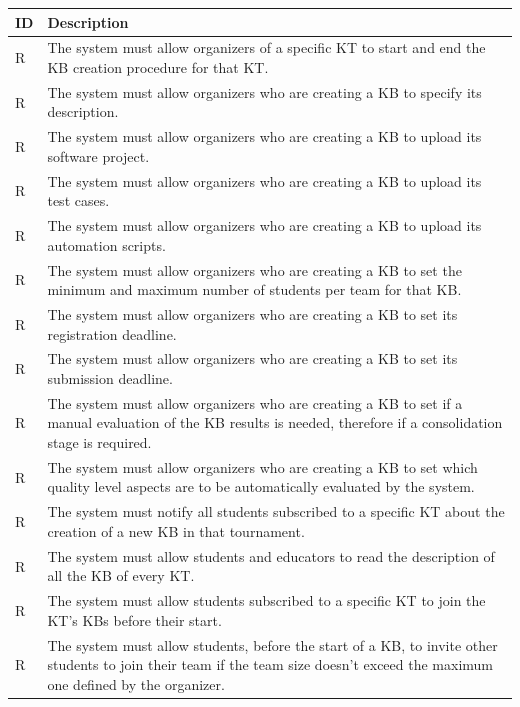 \documentclass[11pt]{report}
\newcounter{rcounter}
\newcommand{\rc}{
    \addtocounter{rcounter}{1}
    R\arabic{rcounter}
}
\begin{document}
\begin{longtable}[h] {|p{10mm}|p{130mm}|}
\hline
\rowcolor{gray!20} 
\textbf{ID} & \textbf{Description} \\ \hline
    \rc & The system must allow organizers of a specific KT to start and end the KB creation procedure for that KT\@.
    \\ \hline
    \rc & The system must allow organizers who are creating a KB to specify its description.
    \\ \hline
    \rc & The system must allow organizers who are creating a KB to upload its software project.
    \\ \hline
    \rc & The system must allow organizers who are creating a KB to upload its test cases.
    \\ \hline
    \rc & The system must allow organizers who are creating a KB to upload its automation scripts.
    \\ \hline
    \rc & The system must allow organizers who are creating a KB to set the minimum and maximum number of students per team for that KB\@.
    \\ \hline
    \rc & The system must allow organizers who are creating a KB to set its registration deadline.
    \\ \hline
    \rc & The system must allow organizers who are creating a KB to set its submission deadline.
    \\ \hline
    \rc & The system must allow organizers who are creating a KB to set if a manual evaluation of the KB results is needed, therefore if a consolidation stage is required.
    \\ \hline
    \rc & The system must allow organizers who are creating a KB to set which quality level aspects are to be automatically evaluated by the system.
    \\ \hline
    \rc & The system must notify all students subscribed to a specific KT about the creation of a new KB in that tournament.
    \\ \hline
    \rc & The system must allow students and educators to read the description of all the KB of every KT\@.
    \\ \hline
    \rc & The system must allow students subscribed to a specific KT to join the KT's KBs before their start.
    \\ \hline
    \rc & The system must allow students, before the start of a KB, to invite other students to join their team if the team size doesn't exceed the maximum one defined by the organizer.
    \\ \hline
\end{longtable}
\end{document}
